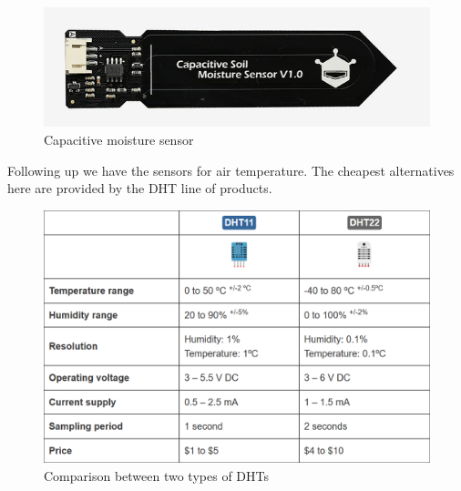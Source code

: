 \documentclass[11pt]{article}
\begin{document}
\begin{enumerate}
    \begin{figure}[ht]
        \centering
        \includegraphics[scale = 0.2]{Capacitive moisture sensor.png}
        \caption{Capacitive moisture sensor}
        \label{fig:Capacitive sensor}
    \end{figure}
\end{enumerate}
\newpage
Following up we have the sensors for air temperature. The cheapest alternatives here are provided by the DHT line of products. 

\begin{figure}[ht]
    \centering
    \includegraphics[scale = 0.35]{DHTs.png}
    \caption{Comparison between two types of DHTs}
    \label{fig:DHTComparison}
\end{figure}
\end{document}
